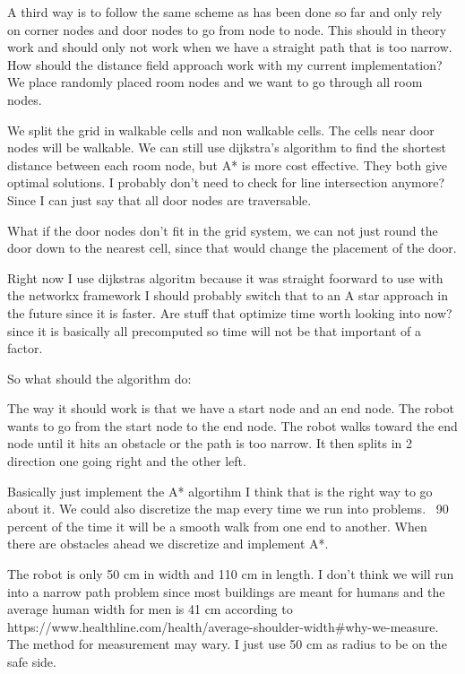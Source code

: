 A third way is to follow the same scheme as has been done so far and only rely on corner nodes and door nodes to go from node to node. This should in theory work and should only not work when we have a straight path that is too narrow. 
How should the distance field approach work with my current implementation?
We place randomly placed room nodes and we want to go through all room nodes. 

We split the grid in walkable cells and non walkable cells. The cells near door nodes will be walkable.
We can still use dijkstra's algorithm to find the shortest distance between each room node, but A* is more cost effective.
They both give optimal solutions.
I probably don't need to check for line intersection anymore? Since I can just say that all door nodes are traversable.

What if the door nodes don't fit in the grid system, we can not just round the door down to the nearest cell, since that would change the placement of the door.

Right now I use dijkstras algoritm because it was straight foorward to use with the networkx framework
I should probably switch that to an A star approach in the future since it is faster. Are stuff that optimize time worth looking into now? since it is basically all precomputed so 
time will not be that important of a factor.



So what should the algorithm do:

The way it should work is that we have a start node and an end node. The robot wants to go from the start node to the end node. The robot walks toward the end node until it hits an obstacle or the path is too narrow. It then splits in 2 direction one going right and the other left.

Basically just implement the A* algortihm I think that is the right way to go about it.
We could also discretize the map every time we run into problems.  90 percent of the time it will be a smooth walk from one end to another. When there are obstacles ahead we discretize and implement A*. 

The robot is only 50 cm in width and 110 cm in length. I don't think we will run into a narrow path problem since most buildings are meant for humans and the average
human width for men is 41 cm according to  https://www.healthline.com/health/average-shoulder-width#why-we-measure. The method for measurement may wary.
I just use 50 cm as radius to be on the safe side.

